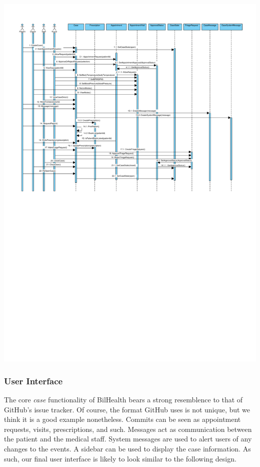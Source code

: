\documentclass[a4paper, 12pt, titlepage]{article}
\begin{document}
  \includegraphics[width=\linewidth]{sequence_diag}

  \pagebreak
  \subsubsection{User Interface}

  The core \textit{case} functionality of BilHealth bears a strong resemblence to that of GitHub's issue tracker.
  Of course, the format GitHub uses is not unique, but we think it is a good example nonetheless.
  Commits can be seen as appointment requests, visits, prescriptions, and such.
  Messages act as communication between the patient and the medical staff.
  System messages are used to alert users of any changes to the events.
  A sidebar can be used to display the case information.
  As such, our final user interface is likely to look similar to the following design.
\end{document}
